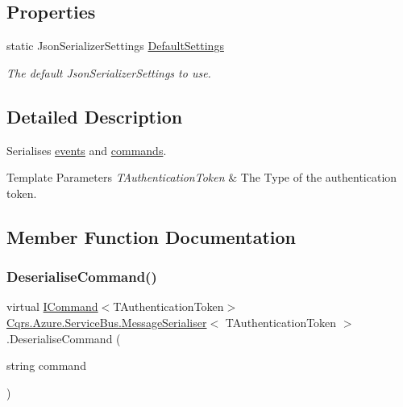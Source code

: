 \subsection*{Properties}
\begin{DoxyCompactItemize}
\item 
static Json\+Serializer\+Settings \hyperlink{classCqrs_1_1Azure_1_1ServiceBus_1_1MessageSerialiser_a71ebae2d4d6352b19b49bd0115b99fcf_a71ebae2d4d6352b19b49bd0115b99fcf}{Default\+Settings}
\begin{DoxyCompactList}\small\item\em The default Json\+Serializer\+Settings to use. \end{DoxyCompactList}\end{DoxyCompactItemize}


\subsection{Detailed Description}
Serialises \hyperlink{}{events} and \hyperlink{}{commands}. 


\begin{DoxyTemplParams}{Template Parameters}
{\em T\+Authentication\+Token} & The Type of the authentication token.\\
\hline
\end{DoxyTemplParams}


\subsection{Member Function Documentation}
\mbox{\label{classCqrs_1_1Azure_1_1ServiceBus_1_1MessageSerialiser_af08efd7ea85a4fefd54df34dd9481f95_af08efd7ea85a4fefd54df34dd9481f95}} 
\subsubsection{\texorpdfstring{Deserialise\+Command()}{DeserialiseCommand()}}
{\footnotesize\ttfamily virtual \hyperlink{interfaceCqrs_1_1Commands_1_1ICommand}{I\+Command}$<$T\+Authentication\+Token$>$ \hyperlink{classCqrs_1_1Azure_1_1ServiceBus_1_1MessageSerialiser}{Cqrs.\+Azure.\+Service\+Bus.\+Message\+Serialiser}$<$ T\+Authentication\+Token $>$.Deserialise\+Command (\begin{DoxyParamCaption}\item[{string}]{command }\end{DoxyParamCaption})\hspace{0.3cm}{\ttfamily [virtual]}}



